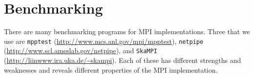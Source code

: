 \documentclass[dvipdfm,11pt]{article}
\begin{document}








\section{Benchmarking}
\label{sec:benchmarking}

There are many benchmarking programs for MPI implementations.  Three
that we use are \texttt{mpptest}
(\url{http://www.mcs.anl.gov/mpi/mpptest}), \texttt{netpipe}
(\url{http://www.scl.ameslab.gov/netpipe}), and \texttt{SkaMPI}
(\url{http://liinwww.ira.uka.de/~skampi}).  Each of these has
different strengths and weaknesses and reveals different properties of
the MPI implementation.
\end{document}
